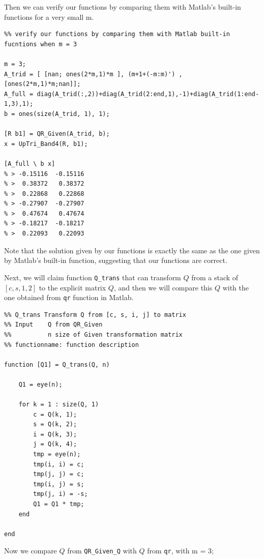\documentclass[12pt,oneside,a4paper]{article}
\newcommand{\m}[1]{\texttt{{#1}}}
\begin{document}
Then we can verify our functions by comparing them with Matlab's built-in functions for a very small m.

\begin{lstlisting}
%% verify our functions by comparing them with Matlab built-in fucntions when m = 3

m = 3;
A_trid = [ [nan; ones(2*m,1)*m ], (m+1+(-m:m)') , [ones(2*m,1)*m;nan]];
A_full = diag(A_trid(:,2))+diag(A_trid(2:end,1),-1)+diag(A_trid(1:end-1,3),1);
b = ones(size(A_trid, 1), 1);

[R b1] = QR_Given(A_trid, b);
x = UpTri_Band4(R, b1);

[A_full \ b x]
% > -0.15116  -0.15116
% >  0.38372   0.38372
% >  0.22868   0.22868
% > -0.27907  -0.27907
% >  0.47674   0.47674
% > -0.18217  -0.18217
% >  0.22093   0.22093
\end{lstlisting}

Note that the solution given by our functions is exactly the same as the one given by Matlab's built-in function, suggesting that our functions are correct.

Next, we will claim function \m{Q\_trans} that can transform $Q$ from a stack of $[c, s, 1, 2]$ to the explicit matrix $Q$, and then we will compare this $Q$ with the one obtained from \m{qr} function in Matlab.

\begin{lstlisting}
%% Q_trans Transform Q from [c, s, i, j] to matrix
%% Input    Q from QR_Given
%%          n size of Given transformation matrix
%% functionname: function description

function [Q1] = Q_trans(Q, n)

    Q1 = eye(n);

    for k = 1 : size(Q, 1)
        c = Q(k, 1);
        s = Q(k, 2);
        i = Q(k, 3);
        j = Q(k, 4);
        tmp = eye(n);
        tmp(i, i) = c;
        tmp(j, j) = c;
        tmp(i, j) = s;
        tmp(j, i) = -s;
        Q1 = Q1 * tmp;
    end

end
\end{lstlisting}

Now we compare $Q$ from \m{QR\_Given\_Q} with $Q$ from \m{qr}, with m = 3;
\end{document}
